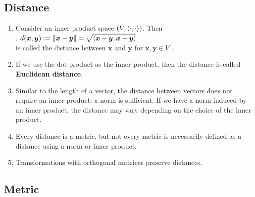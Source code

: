 \subsection{Distance}

\begin{enumerate}
    \item Consider an inner product space $(V,\langle\cdot, \cdot\rangle)$. 
    Then
    \hfill \cite{mfml/book/mml/Deisenroth-Faisal-Ong}
    \\
    .\hfill
    $
        d(\bm{x}, \bm{y})
        := \left\| \bm{x} - \bm{y} \right\|
        = \sqrt{\langle\bm{x} - \bm{y}, \bm{x} - \bm{y}\rangle}
    $
    \hfill \cite{mfml/book/mml/Deisenroth-Faisal-Ong}
    \\
    is called the distance between $\bm{x}$ and $\bm{y}$ for $\bm{x}, \bm{y} \in V$ .
    \hfill \cite{mfml/book/mml/Deisenroth-Faisal-Ong}

    \item If we use the dot product as the inner product, then the distance is called \textbf{Euclidean distance}.
    \hfill \cite{mfml/book/mml/Deisenroth-Faisal-Ong}

    \item Similar to the length of a vector, the distance between vectors does not require an inner product: a norm is sufficient.
    If we have a norm induced by an inner product, the distance may vary depending on the choice of the inner product. 
    \hfill \cite{mfml/book/mml/Deisenroth-Faisal-Ong}

    \item Every distance is a metric, but not every metric is necessarily defined as a distance using a norm or inner product.
    \hfill \cite{common/online/chatgpt}

    \item Transformations with orthogonal matrices preserve distances.
    \hfill \cite{mfml/book/mml/Deisenroth-Faisal-Ong}
\end{enumerate}




\subsection{Metric}

